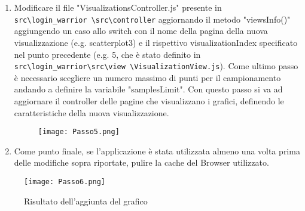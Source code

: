 \begin{enumerate}
    \item Modificare il file "VisualizationsController.js" presente in \texttt{ src\textbackslash login\_warrior \textbackslash src\textbackslash controller} aggiornando il metodo "viewsInfo()" aggiungendo un caso allo switch con il nome della pagina della nuova visualizzazione (e.g. scatterplot3) e il rispettivo visualizationIndex specificato nel punto precedente (e.g. 5, che è stato definito in \texttt{src\textbackslash login\_warrior\textbackslash src\textbackslash view \textbackslash VisualizationView.js}). Come ultimo passo è necessario scegliere un numero massimo di punti per il campionamento andando a definire la variabile "samplesLimit". Con questo passo si va ad aggiornare il controller delle pagine che visualizzano i grafici, definendo le caratteristiche della nuova visualizzazione.
    \begin{figure}[H]
        \centering
        \texttt{[image: Passo5.png]}
      \end{figure}

    \item Come punto finale, se l'applicazione è stata utilizzata almeno una volta prima delle modifiche sopra riportate, pulire la cache del Browser utilizzato.
\end{enumerate}

\begin{figure}[H]
    \centering
    \texttt{[image: Passo6.png]}
    \caption{Risultato dell'aggiunta del grafico}
  \end{figure}